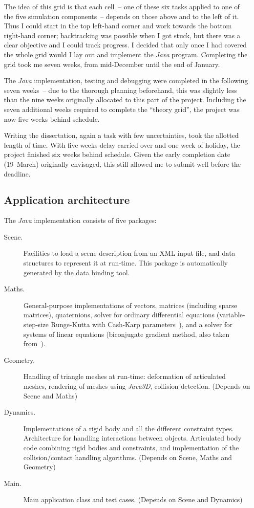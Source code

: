 The idea of this grid is that each cell~-- one of these six tasks applied to one of the five
simulation components~-- depends on those above and to the left of it. Thus I could start in the
top left-hand corner and work towards the bottom right-hand corner; backtracking was possible when
I got stuck, but there was a clear objective and I could track progress. I decided that only
once I had covered the whole grid would I lay out and implement the \textsl{Java} program.
Completing the grid took me seven weeks, from mid-December until the end of January.

The \textsl{Java} implementation, testing and debugging were completed in the following seven
weeks~-- due to the thorough planning beforehand, this was slightly less than the nine weeks
originally allocated to this part of the project. Including the seven additional weeks required to
complete the ``theory grid'', the project was now five weeks behind schedule.

Writing the dissertation, again a task with few uncertainties, took the allotted length of time.
With five weeks delay carried over and one week of holiday, the project finished six weeks behind
schedule. Given the early completion date (19~March) originally envisaged, this still
allowed me to submit well before the deadline.


\subsection{Application architecture\label{architecture}}

The \textsl{Java} implementation consists of five packages:

\begin{description}
\item[Scene.] Facilities to load a scene description from an XML input file, and data structures
    to represent it at run-time. This package is automatically generated by the data binding tool.
\item[Maths.] \sloppypar General-purpose implementations of vectors, matrices (including sparse matrices),
    quaternions, solver for ordinary differential equations (variable-step-size Runge-Kutta with
    Cash-Karp parameters~\cite{NRinC}), and a solver for systems of linear equations (biconjugate
    gradient method, also taken from~\cite{NRinC}).
\item[Geometry.] Handling of triangle meshes at run-time: deformation of articulated meshes,
    rendering of meshes using \textsl{Java3D}, collision detection. (Depends on Scene and Maths)
\item[Dynamics.] Implementations of a rigid body and all the different constraint types.
    Architecture for handling interactions between objects. Articulated body code combining
    rigid bodies and constraints, and implementation of the collision/contact handling algorithms.
    (Depends on Scene, Maths and Geometry)
\item[Main.] Main application class and test cases. (Depends on Scene and Dynamics)
\end{description}

